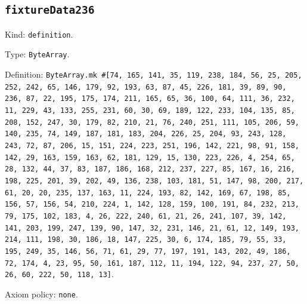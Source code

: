 \documentclass[11pt]{article}
\begin{document}
\subsection*{\texttt{fixtureData236}}
\noindent Kind: \texttt{definition}.\par
\noindent Type: \texttt{ByteArray}.\par
\noindent Definition: \texttt{ByteArray.mk \#[74, 165, 141, 35, 119, 238, 184, 56, 25, 205, 252, 242, 65, 146, 179, 92, 193, 63, 87, 45, 226, 181, 39, 89, 90, 236, 87, 22, 195, 175, 174, 211, 165, 65, 36, 100, 64, 111, 36, 232, 11, 229, 43, 133, 255, 231, 60, 30, 69, 189, 122, 233, 104, 135, 85, 208, 152, 247, 30, 179, 82, 210, 21, 76, 240, 251, 111, 105, 206, 59, 140, 235, 74, 149, 187, 181, 183, 204, 226, 25, 204, 93, 243, 128, 243, 72, 87, 206, 15, 151, 224, 223, 251, 196, 142, 221, 98, 91, 158, 142, 29, 163, 159, 163, 62, 181, 129, 15, 130, 223, 226, 4, 254, 65, 28, 132, 44, 37, 83, 187, 186, 168, 212, 237, 227, 85, 167, 16, 216, 198, 225, 201, 39, 202, 49, 136, 238, 103, 181, 51, 147, 98, 200, 217, 61, 20, 20, 235, 137, 163, 11, 224, 193, 82, 142, 169, 67, 198, 85, 156, 57, 156, 54, 210, 224, 1, 142, 128, 159, 100, 191, 84, 232, 213, 79, 175, 102, 183, 4, 26, 222, 240, 61, 21, 26, 241, 107, 39, 142, 141, 203, 199, 247, 139, 90, 147, 32, 231, 146, 21, 61, 12, 149, 193, 214, 111, 198, 30, 186, 18, 147, 225, 30, 6, 174, 185, 79, 55, 33, 195, 249, 35, 146, 56, 71, 61, 29, 77, 197, 191, 143, 202, 49, 186, 72, 174, 4, 23, 95, 50, 161, 187, 112, 11, 194, 122, 94, 237, 27, 50, 26, 60, 222, 50, 118, 13]}.\par
\noindent Axiom policy: \texttt{none}.\par
\end{document}
